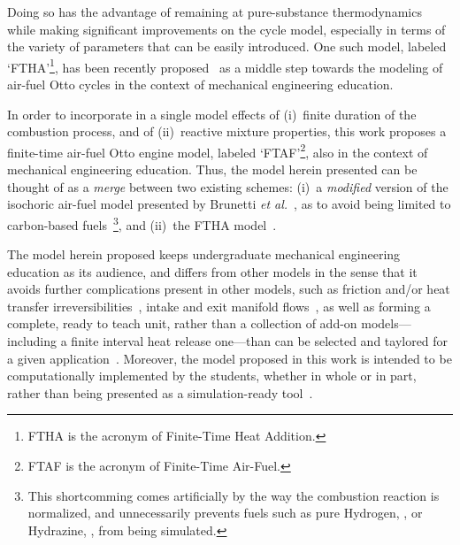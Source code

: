     Doing so has the advantage of remaining at pure-substance thermodynamics while making significant improvements on the  cycle
    model, especially in terms  of  the  variety  of  parameters  that  can  be  easily  introduced.  One  such  model,  labeled
    `FTHA'\footnote{FTHA    is     the     acronym     of     Finite-Time     Heat     Addition.},     has     been     recently
    proposed~\cite{2017-NaaktgeborenC-IntJMechEngEduc} as a middle step towards the modeling of  air-fuel  Otto  cycles  in  the
    context of mechanical engineering education.

    In order to incorporate in a single model effects of (i)~finite duration of the combustion  process,  and  of  (ii)~reactive
    mixture properties, this work proposes a finite-time air-fuel Otto engine model, labeled `FTAF'\footnote{FTAF is the acronym
    of Finite-Time Air-Fuel.}, also in the context of mechanical engineering education. Thus, the model herein presented can  be
    thought of as a \emph{merge} between two existing schemes: (i)~a \emph{modified} version of  the  isochoric  air-fuel  model
    presented  by  Brunetti  \emph{et  al.\/}~\cite{2012-BrunettiF-Blucher},  as  to  avoid  being   limited   to   carbon-based
    fuels~\footnote{This shortcomming comes artificially by the way the combustion reaction  is  normalized,  and  unnecessarily
    prevents fuels such as pure  Hydrogen,  ,  or  Hydrazine,  ,  from  being  simulated.},  and  (ii)~the  FTHA
    model~\cite{2017-NaaktgeborenC-IntJMechEngEduc}.

    The model herein proposed keeps undergraduate mechanical engineering education as  its  audience,  and  differs  from  other
    models in the sense that it avoids further complications present in other models, such  as  friction  and/or  heat  transfer
    irreversibilities~\cite{2008-CurtoRissoPL+HernandezAC-JApplPhys, 2002-CatonJA-IntJMechEngEduc},  intake  and  exit  manifold
    flows~\cite{2001-CatonJA-IntJMechEngEduc}, as well as forming a complete, ready to teach unit, rather than a  collection  of
    add-on  models---including  a  finite  interval  heat  release  one---than  can  be  selected  and  taylored  for  a   given
    application~\cite{2013-MartinsJJG-Publindustria}.  Moreover,  the  model  proposed  in  this  work   is   intended   to   be
    computationally implemented by the students, whether in whole or in part, rather than being presented as a  simulation-ready
    tool~\cite{2011-ZuecoJ-IntJMechEngEduc}.



